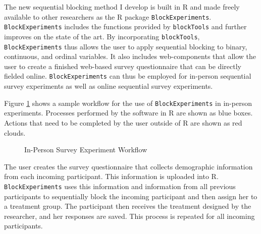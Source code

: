 \documentclass[12pt,]{article}
\begin{document}
The new sequential blocking method I develop is built in R and made
freely available to other researchers as the R package
\texttt{BlockExperiments}. \texttt{BlockExperiments} includes the
functions provided by \texttt{blockTools} \citep{moore_2016_package} and
further improves on the state of the art. By incorporating
\texttt{blockTools}, \texttt{BlockExperiments} thus allows the user to
apply sequential blocking to binary, continuous, and ordinal variables.
It also includes web-components that allow the user to create a finished
web-based survey questionnaire that can be directly fielded online.
\texttt{BlockExperiments} can thus be employed for in-person sequential
survey experiments as well as online sequential survey experiments.

Figure \ref{in-person-workflow} shows a sample workflow for the use of
\texttt{BlockExperiments} in in-person experiments. Processes performed
by the software in R are shown as blue boxes. Actions that need to be
completed by the user outside of R are shown as red clouds.

\vspace{0.4cm}

\begin{figure}[H]
\centering
{}
\caption{In-Person Survey Experiment Workflow} \label{in-person-workflow}
\end{figure}

The user creates the survey questionnaire that collects demographic
information from each incoming participant. This information is uploaded
into R. \texttt{BlockExperiments} uses this information and information
from all previous participants to sequentially block the incoming
participant and then assign her to a treatment group. The participant
then receives the treatment designed by the researcher, and her
responses are saved. This process is repeated for all incoming
participants.
\end{document}
